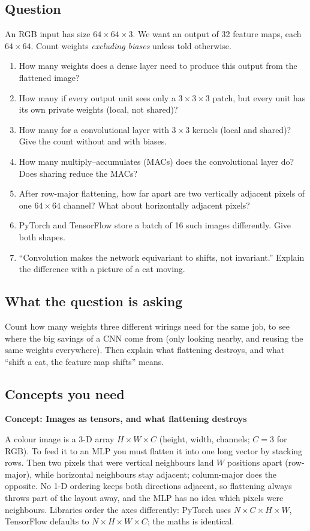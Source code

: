 \documentclass[12pt,a4paper]{article}
\newcommand{\concept}[2]{\par\medskip\phantomsection\label{#1}{\large\bfseries\color{blue!50!black} Concept: #2}\par}
\begin{document}
\subsection*{Question}
An RGB input has size $64\times64\times3$. We want an output of 32 feature maps, each $64\times64$. Count weights \emph{excluding biases} unless told otherwise.
\begin{enumerate}[label=(\alph*)]
\item How many weights does a dense layer need to produce this output from the flattened image?
\item How many if every output unit sees only a $3\times3\times3$ patch, but every unit has its own private weights (local, not shared)?
\item How many for a convolutional layer with $3\times3$ kernels (local and shared)? Give the count without and with biases.
\item How many multiply--accumulates (MACs) does the convolutional layer do? Does sharing reduce the MACs?
\item After row-major flattening, how far apart are two vertically adjacent pixels of one $64\times64$ channel? What about horizontally adjacent pixels?
\item PyTorch and TensorFlow store a batch of 16 such images differently. Give both shapes.
\item ``Convolution makes the network equivariant to shifts, not invariant.'' Explain the difference with a picture of a cat moving.
\end{enumerate}

\subsection*{What the question is asking}
Count how many weights three different wirings need for the same job, to see where the big savings of a CNN come from (only looking nearby, and reusing the same weights everywhere). Then explain what flattening destroys, and what ``shift a cat, the feature map shifts'' means.

\subsection*{Concepts you need}

\concept{c:imgtensor}{Images as tensors, and what flattening destroys}
A colour image is a 3-D array $H\times W\times C$ (height, width, channels; $C=3$ for RGB). To feed it to an MLP you must flatten it into one long vector by stacking rows. Then two pixels that were vertical neighbours land $W$ positions apart (row-major), while horizontal neighbours stay adjacent; column-major does the opposite. No 1-D ordering keeps both directions adjacent, so flattening always throws part of the layout away, and the MLP has no idea which pixels were neighbours. Libraries order the axes differently: PyTorch uses $N\times C\times H\times W$, TensorFlow defaults to $N\times H\times W\times C$; the maths is identical.
\end{document}
